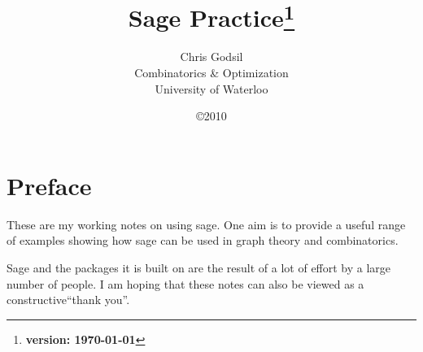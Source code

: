 \documentclass[twoside, openright, 12pt]{book}
\author{
Chris Godsil\\
Combinatorics \& Optimization\\
University of Waterloo}
\title{\bf Sage Practice\footnote{\textbf{version: \today}}}
\date{\copyright 2010}
\theoremstyle{plainsl}
\numberwithin{equation}{section}
\begin{document}
\maketitle

\chapter*{Preface}

These are my working notes on using sage. One aim is to provide a useful
range of examples showing how sage can be used in graph theory and
combinatorics.

Sage and the packages it is built on are the result of a lot of effort by a 
large number of people. I am hoping that these notes can also be viewed
as a constructive``thank you''.

\tableofcontents







\end{document}
